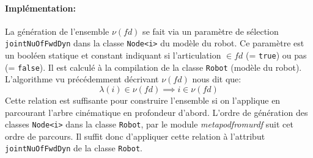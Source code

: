 \documentclass{report}
\begin{document}
\paragraph{Implémentation:}
La génération de l'ensemble $\nu(fd)$ se fait via un paramètre de sélection \verb;jointNuOfFwdDyn; dans la classe \verb;Node<i>; du modèle du robot. Ce paramètre est un booléen statique et constant indiquant si l'articulation $\in fd$ (= \verb;true;) ou pas (= \verb;false;). Il est calculé à la compilation de la classe \verb;Robot; (modèle du robot). L'algorithme vu précédemment décrivant $\nu(fd)$ nous dit que:
\begin{equation*}
\lambda(i) \in \nu(fd) \implies i \in \nu(fd)
\end{equation*}
Cette relation est suffisante pour construire l'ensemble si on l'applique en parcourant l'arbre cinématique en profondeur d'abord. L'ordre de génération des classes \verb;Node<i>; dans la classe \verb;Robot;, par le module \emph{metapodfromurdf} suit cet ordre de parcours. Il suffit donc d'appliquer cette relation à l'attribut \verb;jointNuOfFwdDyn; de la classe \verb;Robot;.
\end{document}
